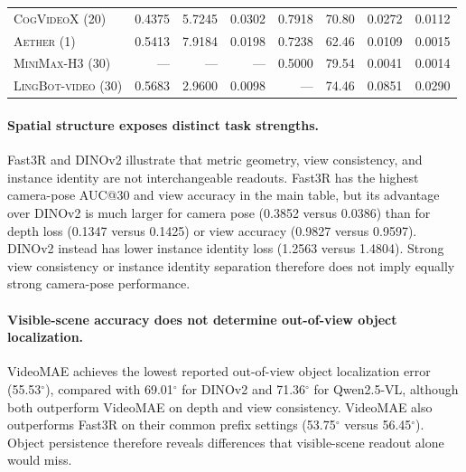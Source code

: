 \documentclass{article} %
\newcommand{\model}[1]{\textsc{#1}}
\begin{document}
\begin{table}[tbp]
\begin{tabular}{@{}lrrrrrrr@{}}
    \model{CogVideoX} (20)
      & 0.4375
      & 5.7245
      & 0.0302
      & 0.7918
      & 70.80
      & 0.0272
      & 0.0112 \\

    \model{Aether} (1)
      & 0.5413
      & 7.9184
      & 0.0198
      & 0.7238
      & 62.46
      & 0.0109
      & 0.0015 \\


    \model{MiniMax-H3} (30)
      & ---
      & ---
      & ---
      & 0.5000
      & 79.54
      & 0.0041
      & 0.0014 \\

    \model{LingBot-video} (30)
      & 0.5683
      & 2.9600
      & 0.0098
      & ---
      & 74.46
      & 0.0851
      & 0.0290 \\

    \bottomrule
  \end{tabular}
\end{table}

\paragraph{Spatial structure exposes distinct task strengths.}
Fast3R and DINOv2 illustrate that metric geometry, view consistency, and instance
identity are not interchangeable readouts. Fast3R has the highest
camera-pose AUC@30 and view accuracy in the main table, but its advantage
over DINOv2 is much larger for camera pose (0.3852 versus 0.0386) than for
depth loss (0.1347 versus 0.1425) or view accuracy (0.9827 versus 0.9597).
DINOv2 instead has lower instance identity loss (1.2563 versus 1.4804).
Strong view consistency or instance identity separation therefore does
not imply equally strong camera-pose performance.

\paragraph{Visible-scene accuracy does not determine out-of-view object localization.}
VideoMAE achieves the lowest reported out-of-view object localization error
(55.53$^{\circ}$), compared with 69.01$^{\circ}$ for DINOv2 and
71.36$^{\circ}$ for Qwen2.5-VL, although both outperform VideoMAE on depth
and view consistency. VideoMAE also outperforms Fast3R on their common
prefix settings (53.75$^{\circ}$ versus 56.45$^{\circ}$).
Object persistence therefore reveals differences that visible-scene readout
alone would miss. 
\end{document}
